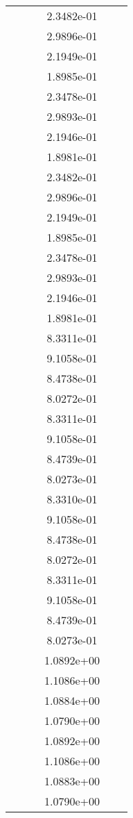 \begin{xltabular}{\textwidth}{r|rS[table-format=1.3e+2]S[table-format=1.4e+2]S[table-format=1.4e+2]S[table-format=-1.5]}
&  &  & 2.3482e-01 & & \\
&  &  & 2.9896e-01 & & \\
&  &  & 2.1949e-01 & & \\
&  &  & 1.8985e-01 & & \\
&  &  & 2.3478e-01 & & \\
&  &  & 2.9893e-01 & & \\
&  &  & 2.1946e-01 & & \\
&  &  & 1.8981e-01 & & \\
&  &  & 2.3482e-01 & & \\
&  &  & 2.9896e-01 & & \\
&  &  & 2.1949e-01 & & \\
&  &  & 1.8985e-01 & & \\
&  &  & 2.3478e-01 & & \\
&  &  & 2.9893e-01 & & \\
&  &  & 2.1946e-01 & & \\
&  &  & 1.8981e-01 & & \\
&  &  & 8.3311e-01 & & \\
&  &  & 9.1058e-01 & & \\
&  &  & 8.4738e-01 & & \\
&  &  & 8.0272e-01 & & \\
&  &  & 8.3311e-01 & & \\
&  &  & 9.1058e-01 & & \\
&  &  & 8.4739e-01 & & \\
&  &  & 8.0273e-01 & & \\
&  &  & 8.3310e-01 & & \\
&  &  & 9.1058e-01 & & \\
&  &  & 8.4738e-01 & & \\
&  &  & 8.0272e-01 & & \\
&  &  & 8.3311e-01 & & \\
&  &  & 9.1058e-01 & & \\
&  &  & 8.4739e-01 & & \\
&  &  & 8.0273e-01 & & \\
&  &  & 1.0892e+00 & & \\
&  &  & 1.1086e+00 & & \\
&  &  & 1.0884e+00 & & \\
&  &  & 1.0790e+00 & & \\
&  &  & 1.0892e+00 & & \\
&  &  & 1.1086e+00 & & \\
&  &  & 1.0883e+00 & & \\
&  &  & 1.0790e+00 & & \\

\end{xltabular}
